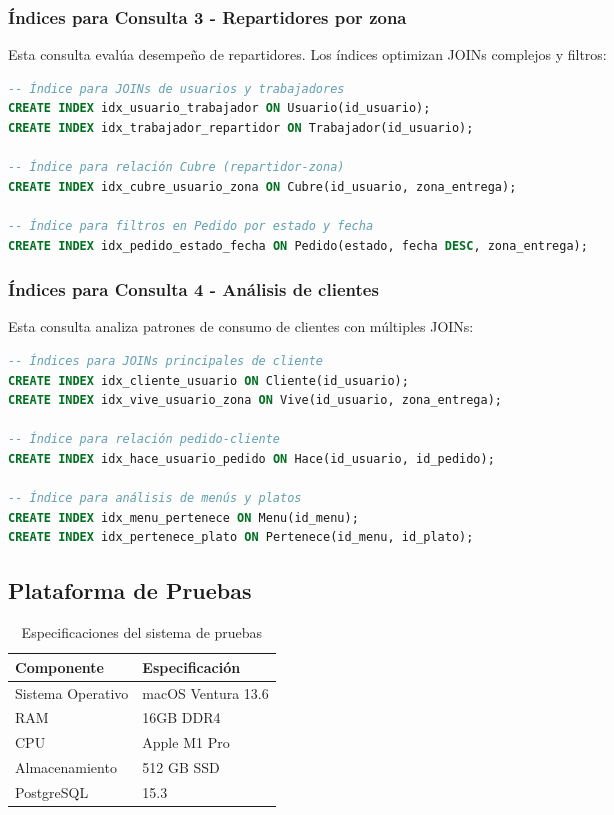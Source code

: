 \documentclass[12pt,a4paper]{article}
\begin{document}
\subsubsection{Índices para Consulta 3 - Repartidores por zona}
Esta consulta evalúa desempeño de repartidores. Los índices optimizan JOINs complejos y filtros:

\begin{lstlisting}[language=SQL]
-- Índice para JOINs de usuarios y trabajadores
CREATE INDEX idx_usuario_trabajador ON Usuario(id_usuario);
CREATE INDEX idx_trabajador_repartidor ON Trabajador(id_usuario);

-- Índice para relación Cubre (repartidor-zona)
CREATE INDEX idx_cubre_usuario_zona ON Cubre(id_usuario, zona_entrega);

-- Índice para filtros en Pedido por estado y fecha
CREATE INDEX idx_pedido_estado_fecha ON Pedido(estado, fecha DESC, zona_entrega);
\end{lstlisting}

\subsubsection{Índices para Consulta 4 - Análisis de clientes}
Esta consulta analiza patrones de consumo de clientes con múltiples JOINs:

\begin{lstlisting}[language=SQL]
-- Índices para JOINs principales de cliente
CREATE INDEX idx_cliente_usuario ON Cliente(id_usuario);
CREATE INDEX idx_vive_usuario_zona ON Vive(id_usuario, zona_entrega);

-- Índice para relación pedido-cliente
CREATE INDEX idx_hace_usuario_pedido ON Hace(id_usuario, id_pedido);

-- Índice para análisis de menús y platos
CREATE INDEX idx_menu_pertenece ON Menu(id_menu);
CREATE INDEX idx_pertenece_plato ON Pertenece(id_menu, id_plato);
\end{lstlisting}

\subsection{Plataforma de Pruebas}
\begin{table}[h!]
\centering
\begin{tabular}{|l|l|}
\hline
\textbf{Componente} & \textbf{Especificación} \\
\hline
Sistema Operativo & macOS Ventura 13.6 \\
RAM & 16GB DDR4 \\
CPU & Apple M1 Pro \\
Almacenamiento & 512 GB SSD \\
PostgreSQL & 15.3 \\
\hline
\end{tabular}
\caption{Especificaciones del sistema de pruebas}
\label{table:plataforma}
\end{table}
\end{document}
